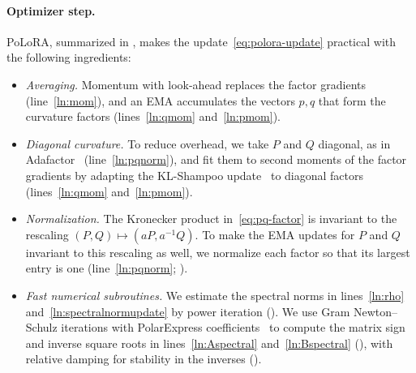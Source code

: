 \documentclass[11pt]{article}
\newcommand{\methodname}{PoLoRA\xspace}
\theoremstyle{plain}
\theoremstyle{definition}
\theoremstyle{remark}
\theoremstyle{definition}
\begin{document}
\paragraph{Optimizer step.}
\methodname{}, summarized in , makes the update~\eqref{eq:polora-update} practical with the following ingredients:
\begin{itemize}[leftmargin=1.5em,itemsep=1pt,topsep=2pt]
  \item \emph{Averaging.} Momentum with look-ahead replaces the factor gradients (line~\ref{ln:mom}), and an EMA accumulates the vectors $p,q$ that form the curvature factors (lines~\ref{ln:qmom} and~\ref{ln:pmom}).  \item \emph{Diagonal curvature.} To reduce overhead, we take $P$ and $Q$ diagonal, as in Adafactor~\cite{adafactor} (line~\ref{ln:pqnorm}), and fit them to second moments of the factor gradients by adapting the KL-Shampoo update~\cite{klshampoo} to diagonal factors (lines~\ref{ln:qmom} and~\ref{ln:pmom}).
  \item \emph{Normalization.} The Kronecker product in~\eqref{eq:pq-factor} is invariant to the rescaling $(P,Q)\mapsto(aP,a^{-1}Q)$. To make the EMA updates for $P$ and $Q$ invariant to this rescaling as well, we normalize each factor so that its largest entry is one (line~\ref{ln:pqnorm}; ).
  \item \emph{Fast numerical subroutines.} We estimate the spectral norms in lines~\ref{ln:rho} and~\ref{ln:spectralnormupdate} by power iteration (). We use Gram Newton--Schulz iterations with PolarExpress coefficients~\cite{polarexpress} to compute the matrix sign and inverse square roots in lines~\ref{ln:Aspectral} and~\ref{ln:Bspectral} (), with relative damping for stability in the inverses ().
\end{itemize}
\end{document}
